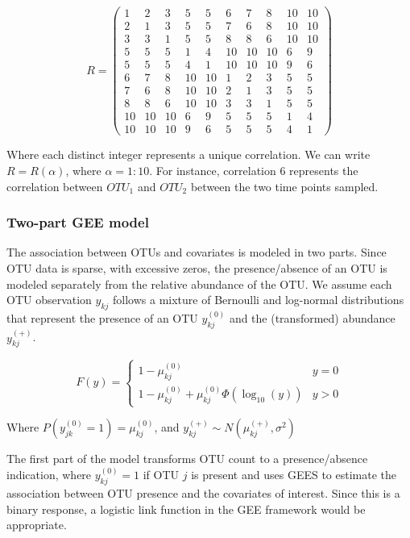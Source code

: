 \documentclass[12pt]{article}
\begin{document}
\begin{singlespace}
$$R = \begin{pmatrix}
        1 & 2 & 3 & 5 & 5 &  6 & 7 & 8 & 10 & 10 \\
        2 & 1 & 3 & 5 & 5 & 7 & 6 & 8 & 10 & 10 \\
        3 & 3 & 1 & 5 & 5 & 8 & 8 & 6 & 10 & 10 \\
        5 & 5 & 5 & 1 & 4 & 10 & 10 & 10 & 6 & 9 \\
        5 & 5 & 5 & 4 & 1 & 10 & 10 & 10  & 9 & 6 \\
        6 & 7 & 8 & 10 & 10 & 1 & 2 & 3 & 5 & 5  \\
        7 & 6 & 8 & 10 & 10 & 2 & 1 & 3 & 5 & 5  \\
        8 & 8 & 6 & 10 & 10 & 3 & 3 & 1 & 5 & 5 \\
        10 & 10 & 10 & 6 & 9 & 5 & 5 & 5 & 1 & 4  \\
        10 & 10 & 10  & 9 & 6  & 5 & 5 & 5 & 4 & 1
  \end{pmatrix}$$
\end{singlespace}
Where each distinct integer represents a unique correlation. We can write $R = R(\alpha)$, where $\alpha = 1:10$. For instance, correlation 6 represents the correlation between $OTU_1$ and $OTU_2$ between the two time points sampled.

\subsubsection{Two-part GEE model}

The association between OTUs and covariates is modeled in two parts. Since OTU data is sparse, with excessive zeros, the presence/absence of an OTU is modeled separately from the relative abundance of the OTU. We assume each OTU observation $y_{kj}$ follows a mixture of Bernoulli and log-normal distributions that represent the presence of an OTU $y_{kj}^{(0)}$ and the (transformed) abundance $y_{kj}^{(+)}$.

$$F(y) = \begin{cases}
  1 - \mu_{kj}^{(0)} & y = 0\\
  1 - \mu_{kj}^{(0)} + \mu_{kj}^{(0)}\Phi(\log_{10}(y)) & y > 0
\end{cases}
$$

Where $P(y_{jk}^{(0)} = 1) = \mu_{kj}^{(0)}$, and $y_{kj}^{(+)} \sim N(\mu_{kj}^{(+)}, \sigma^2)$

The first part of the model transforms OTU count to a presence/absence indication, where $y_{kj}^{(0)} = 1$ if OTU $j$ is present and uses GEES to estimate the association between OTU presence and the covariates of interest. Since this is a binary response, a logistic link function in the GEE framework would be appropriate.
\end{document}
